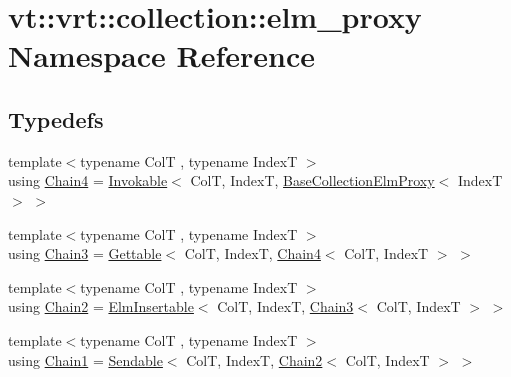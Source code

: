 \hypertarget{namespacevt_1_1vrt_1_1collection_1_1elm__proxy}{}\section{vt\+:\+:vrt\+:\+:collection\+:\+:elm\+\_\+proxy Namespace Reference}
\label{namespacevt_1_1vrt_1_1collection_1_1elm__proxy}
\subsection*{Typedefs}
\begin{DoxyCompactItemize}
\item 
{\footnotesize template$<$typename ColT , typename IndexT $>$ }\\using \hyperlink{namespacevt_1_1vrt_1_1collection_1_1elm__proxy_abfedbd295b36f2dd58c595f4f6f832f3}{Chain4} = \hyperlink{structvt_1_1vrt_1_1collection_1_1_invokable}{Invokable}$<$ ColT, IndexT, \hyperlink{structvt_1_1vrt_1_1collection_1_1_base_collection_elm_proxy}{Base\+Collection\+Elm\+Proxy}$<$ IndexT $>$ $>$
\item 
{\footnotesize template$<$typename ColT , typename IndexT $>$ }\\using \hyperlink{namespacevt_1_1vrt_1_1collection_1_1elm__proxy_a8db2caa0e0d4bb8dafc382c8953b2574}{Chain3} = \hyperlink{structvt_1_1vrt_1_1collection_1_1_gettable}{Gettable}$<$ ColT, IndexT, \hyperlink{namespacevt_1_1vrt_1_1collection_1_1elm__proxy_abfedbd295b36f2dd58c595f4f6f832f3}{Chain4}$<$ ColT, IndexT $>$ $>$
\item 
{\footnotesize template$<$typename ColT , typename IndexT $>$ }\\using \hyperlink{namespacevt_1_1vrt_1_1collection_1_1elm__proxy_ad78450181b0704fe0969ae1d0f6cb4c7}{Chain2} = \hyperlink{structvt_1_1vrt_1_1collection_1_1_elm_insertable}{Elm\+Insertable}$<$ ColT, IndexT, \hyperlink{namespacevt_1_1vrt_1_1collection_1_1elm__proxy_a8db2caa0e0d4bb8dafc382c8953b2574}{Chain3}$<$ ColT, IndexT $>$ $>$
\item 
{\footnotesize template$<$typename ColT , typename IndexT $>$ }\\using \hyperlink{namespacevt_1_1vrt_1_1collection_1_1elm__proxy_af1c695e3f939aca249111179a57b24bf}{Chain1} = \hyperlink{structvt_1_1vrt_1_1collection_1_1_sendable}{Sendable}$<$ ColT, IndexT, \hyperlink{namespacevt_1_1vrt_1_1collection_1_1elm__proxy_ad78450181b0704fe0969ae1d0f6cb4c7}{Chain2}$<$ ColT, IndexT $>$ $>$
\end{DoxyCompactItemize}


